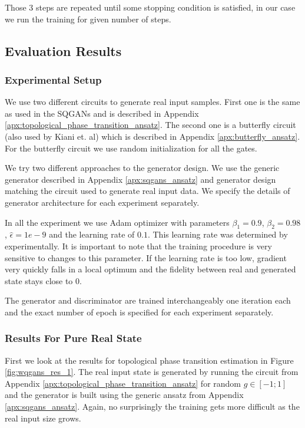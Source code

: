 Those 3 steps are repeated until some stopping condition is satisfied, in our
case we run the training for given number of steps.

\subsection{Evaluation Results}
\subsubsection{Experimental Setup}
We use two different circuits to generate real input samples. First one is the
same as used in the SQGANs and is described in Appendix
\ref{apx:topological_phase_transition_ansatz}.
The second one is a butterfly circuit (also used by Kiani et.
al\cite{kiani2021quantum}) which is described in Appendix
\ref{apx:butterfly_ansatz}. For the butterfly circuit we use random
initialization for all the gates.

We try two different approaches to the generator design. We use the generic
generator described in Appendix \ref{apx:sqgans_ansatz} and generator
design matching the circuit used to generate real input data. We specify the
details of generator architecture for each experiment separately.

In all the experiment we use Adam optimizer \cite{kingma2017adam} with
parameters $\beta_1 = 0.9$, $\beta_2=0.98$, $\hat{\epsilon} = 1e-9$ and the
learning rate of $0.1$. This learning rate was determined by experimentally. It
is important to note that the training procedure is very sensitive to changes to
this parameter. If the learning rate is too low, gradient very quickly falls in
a local optimum and the fidelity between real and generated state stays close to $0$.

The generator and discriminator are trained interchangeably one iteration each
and the exact number of epoch is specified for each experiment separately.
\subsubsection{Results For Pure Real State}
First we look at the results for topological phase transition estimation in
Figure \ref{fig:wqgans_res_1}. The real input state is generated by running the circuit from Appendix
\ref{apx:topological_phase_transition_ansatz} for random $g \in [-1; 1]$ and the
generator is built using the generic ansatz from Appendix
\ref{apx:sqgans_ansatz}. Again, no surprisingly the training gets more difficult
as the real input size grows.

